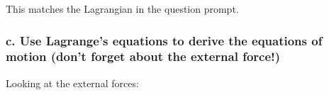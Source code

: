\documentclass[12pt, letterpaper]{../assignment}
\begin{document}
This matches the Lagrangian in the question prompt.

\subsubsection*{c. Use Lagrange's equations to derive the equations of motion (don't forget about the external
force!)}

Looking at the external forces:





\end{document}
